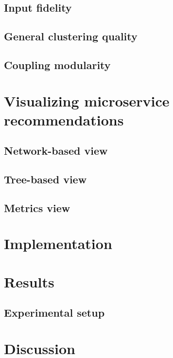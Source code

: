 \documentclass[12pt,a4paper]{report}
\begin{document}
\section{Input fidelity}

\section{General clustering quality}

\section{Coupling modularity}




\chapter{Visualizing microservice recommendations}

\section{Network-based view}

\section{Tree-based view}

\section{Metrics view}




\chapter{Implementation}




\chapter{Results}

\section{Experimental setup}




\chapter{Discussion} \label{chap:discussion}
\end{document}
